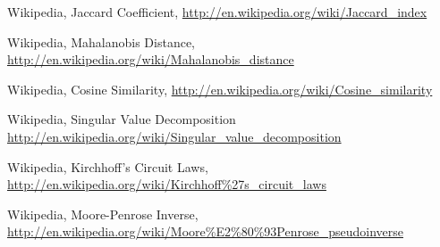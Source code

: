 	Wikipedia, Jaccard Coefficient, 
	\url{http://en.wikipedia.org/wiki/Jaccard_index}
	
	Wikipedia, Mahalanobis Distance, 
	\url{http://en.wikipedia.org/wiki/Mahalanobis_distance}
	
	Wikipedia, Cosine Similarity, 
	\url{http://en.wikipedia.org/wiki/Cosine_similarity}
	
	Wikipedia, Singular Value Decomposition
	\url{http://en.wikipedia.org/wiki/Singular_value_decomposition}
	
	Wikipedia, Kirchhoff's Circuit Laws, 
	\url{http://en.wikipedia.org/wiki/Kirchhoff%27s_circuit_laws}
	
	Wikipedia, Moore-Penrose Inverse, 
	\url{http://en.wikipedia.org/wiki/Moore%E2%80%93Penrose_pseudoinverse}